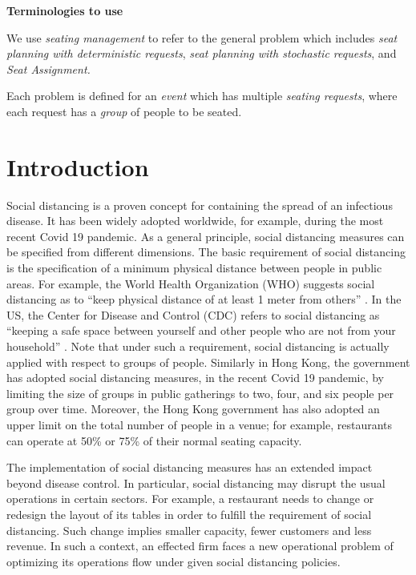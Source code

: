 
{\bf Terminologies to use}

We use {\em seating management} to refer to the general problem which includes {\em seat planning with deterministic requests}, 
{\em seat planning with stochastic requests}, and {\em Seat Assignment.}

Each problem is defined for an {\em event} which has multiple {\em seating  requests}, where each request has a {\em group} of people to be seated.

\section{Introduction}
Social distancing is a proven concept for containing the spread of an infectious disease. It has been widely adopted worldwide, for example, during the most recent Covid 19 pandemic. As a general principle, social distancing measures can be specified from different dimensions. The basic requirement of social distancing is the specification of a minimum physical distance between people in public areas. For example, the World Health Organization (WHO) suggests social distancing as to ``keep physical distance of at least 1 meter from others'' \cite{AdviceforPublic}. In the US, the Center for Disease and Control (CDC) refers to social distancing as ``keeping a safe space between yourself and other people who are not from your household'' \cite{CDC}. 
Note that under such a requirement, social distancing is actually applied with respect to groups of people. Similarly in Hong Kong, the government has adopted social distancing measures, in the recent Covid 19 pandemic, by limiting the size of groups in public gatherings to two, four, and six people per group over time. Moreover, the Hong Kong government has also adopted an upper limit on the total number of people in a venue; for example, restaurants can operate at 50\% or 75\% of their normal seating capacity. 

The implementation of social distancing measures has an extended impact beyond disease control. In particular, social distancing may disrupt the usual operations in certain sectors. For example, a restaurant needs to change or redesign the layout of its tables in order to fulfill the requirement of social distancing. Such change implies smaller capacity, fewer customers and less revenue. In such a context, an effected firm faces a new operational problem of optimizing its operations flow under given social distancing policies.

